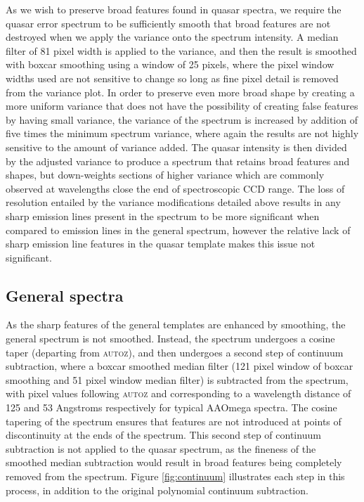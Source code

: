 \documentclass[iop]{emulateapj}
\newcommand{\autoz}{\textsc{autoz}}
\begin{document}
As we wish to preserve broad features found in quasar spectra, we require the quasar error spectrum to be sufficiently smooth that broad features are not destroyed when we apply the variance onto the spectrum intensity. A median filter of 81 pixel width is applied to the variance, and then the result is smoothed with boxcar smoothing using a window of 25 pixels, where the pixel window widths used are not sensitive to change so long as fine pixel detail is removed from the variance plot. In order to preserve even more broad shape by creating a more uniform variance that does not have the possibility of creating false features by having small variance, the variance of the spectrum is increased by addition of five times the minimum spectrum variance, where again the results are not highly sensitive to the amount of variance added. The quasar intensity is then divided by the adjusted variance to produce a spectrum that retains broad features and shapes, but down-weights sections of higher variance which are commonly observed at wavelengths close the end of spectroscopic CCD range. The loss of resolution entailed by the variance modifications detailed above results in any sharp emission lines present in the spectrum to be more significant when compared to emission lines in the general spectrum, however the relative lack of sharp emission line features in the quasar template makes this issue not significant.\\

\subsection{General spectra}

As the sharp features of the general templates are enhanced by smoothing, the general spectrum is not smoothed. Instead, the spectrum undergoes a cosine taper (departing from \autoz{}), and then undergoes a second step of continuum subtraction, where a boxcar smoothed median filter (121 pixel window of boxcar smoothing and 51 pixel window median filter) is subtracted from the spectrum, with pixel values following \autoz{} and corresponding to a wavelength distance of 125 and 53 Angstroms respectively for typical AAOmega spectra. The cosine tapering of the spectrum ensures that features are not introduced at points of discontinuity at the ends of the spectrum.  This second step of continuum subtraction is not applied to the quasar spectrum, as the fineness of the smoothed median subtraction would result in broad features being completely removed from the spectrum. Figure \ref{fig:continuum} illustrates each step in this process, in addition to the original polynomial continuum subtraction.\\
\end{document}
